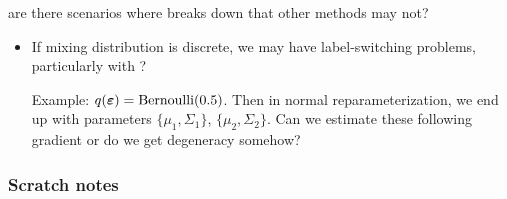 \documentclass[10pt]{article}
\begin{document}
\todo are there scenarios where \uivi breaks down that other \vi methods may not?

\begin{itemize}

\item
If mixing distribution is discrete, we may have label-switching problems, particularly with \mcmc? \citep{Chung:2004}

Example: $q(\bm{\varepsilon})=\mathrm{Bernoulli}(0.5)$. Then in normal reparameterization, we end up with parameters $\{\mu_1,\Sigma_1\}$, $\{\mu_2,\Sigma_2\}$. Can we estimate these following \elbo gradient or do we get degeneracy somehow?

\end{itemize}


\subsubsection{Scratch notes}
\end{document}

